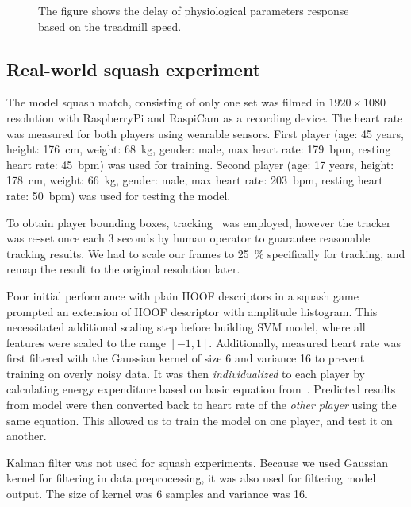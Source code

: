 \begin{figure}[!htb]
	\centering
    \caption{The figure shows the delay of physiological parameters response based on the treadmill speed.}
    \label{fig:zakasnitev}
\end{figure}


\subsection{Real-world squash experiment}

The model squash match, consisting of only one set was filmed in $1920 \times 1080$ resolution with RaspberryPi and RaspiCam as a recording device. The heart rate was measured for both players using wearable sensors. First player (age: 45 years, height: \SI{176}{\cm}, weight: \SI{68}{\kg}, gender: male, max heart rate: \SI{179}{bpm}, resting heart rate: \SI{45}{bpm}) was used for training. Second player (age: 17 years, height: \SI{178}{\cm}, weight: \SI{66}{\kg}, gender: male, max heart rate: \SI{203}{bpm}, resting heart rate: \SI{50}{bpm}) was used for testing the model.

To obtain player bounding boxes, tracking~\cite{danelljan2014adaptive} was employed, however the tracker was re-set once each 3 seconds by human operator to guarantee reasonable tracking results. We had to scale our frames to \SI{25}{\%} specifically for tracking, and remap the result to the original resolution later.

Poor initial performance with plain HOOF descriptors in a squash game prompted an extension of HOOF descriptor with amplitude histogram. This necessitated additional scaling step before building SVM model, where all features were scaled to the range $[-1, 1]$. Additionally, measured heart rate was first filtered with the Gaussian kernel of size \num{6} and variance \num{16} to prevent training on overly noisy data. It was then \emph{individualized} to each player by calculating energy expenditure based on basic equation from~\cite{charlot2014improvement}. Predicted results from model were then converted back to heart rate of the \emph{other player} using the same equation. This allowed us to train the model on one player, and test it on another. 

Kalman filter was not used for squash experiments. Because we used Gaussian kernel for filtering in data preprocessing, it was also used for filtering model output. The size of kernel was \num{6} samples and variance was \num{16}.

